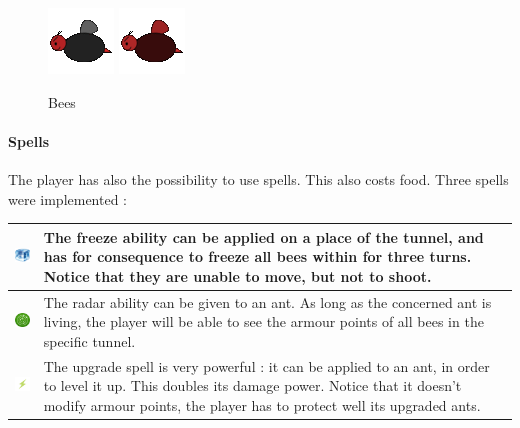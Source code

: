 \documentclass[a4paper]{article}
\begin{document}
\begin{figure}[H]
	\center
	\includegraphics[scale=0.5]{bee.png}
	\includegraphics[scale=0.5]{rangebee.png}
	\caption{Bees}
	\label{bees}
\end{figure}

\paragraph{Spells} The player has also the possibility to use spells. This also costs food. Three spells were implemented :
 
\begin{center}
	\begin{tabular}{|c|p{13cm}|}
		\hline
		\rule[1mm]{0pt}{8mm}
		\includegraphics[scale=0.5]{freeze.png}
		   & The freeze ability can be applied on a place of the tunnel, and has for consequence to freeze all bees within for three turns. Notice that they are unable to move, but not to shoot. \\
		\hline
		\rule[1mm]{0pt}{8mm}
		\includegraphics[scale=0.5]{radar.png}
		 & The radar ability can be given to an ant. As long as the concerned ant is living, the player will be able to see the armour points of all bees in the specific tunnel. \\
		\hline
		\rule[1mm]{0pt}{8mm}
		\includegraphics[scale=0.5]{double.png}
		 & The upgrade spell is very powerful : it can be applied to an ant, in order to level it up. This doubles its damage power. Notice that it doesn't modify armour points, the player has to protect well its upgraded ants. \\
		\hline
	\end{tabular}
\end{center}
\end{document}
